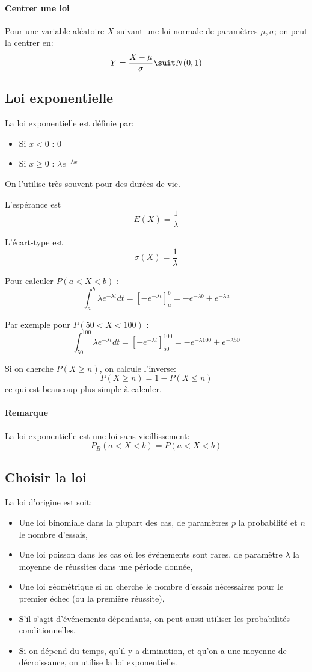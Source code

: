 \documentclass[10pt,a4paper,french]{article}
\begin{document}
\paragraph{Centrer une loi}
Pour une variable aléatoire $X$ suivant une loi normale de paramètres $\mu, \sigma$; on peut la centrer en: 
\[Y = \frac{X - \mu}{\sigma} \suit N(0, 1)\]

\subsection{Loi exponentielle}

La loi exponentielle est définie par:
\begin{itemize}
\item Si $x < 0$ : 0
\item Si $x \geq 0$ : $\lambda e^{-\lambda x}$
\end{itemize}

On l'utilise très souvent pour des durées de vie.

L'espérance est \[E(X) = \frac{1}{\lambda}\]

L'écart-type est \[ \sigma(X) = \frac{1}{\lambda} \]

Pour calculer $P(a < X < b)$ : \[ \int_a^b \lambda e^{-\lambda t} dt = \left[ -e^{-\lambda t} \right]_a^b = -e^{-\lambda b} + e^{-\lambda a} \]

Par exemple pour $P(50 < X < 100)$ : \[ \int_{50}^{100} \lambda e^{-\lambda t} dt = \left[ -e^{-\lambda t} \right]_{50}^{100} = -e^{-\lambda 100} + e^{-\lambda 50} \]

Si on cherche $P(X \geq n)$, on calcule l'inverse: \[ P(X \geq n) = 1 - P(X \leq n) \] ce qui est beaucoup plus simple à calculer.

\paragraph{Remarque}
La loi exponentielle est une loi sans vieillissement: \[ P_B(a < X < b) = P(a < X < b) \]

\subsection{Choisir la loi}

La loi d'origine est soit:

\begin{itemize}
\item Une loi binomiale dans la plupart des cas, de paramètres $p$ la probabilité et $n$ le nombre d'essais,
\item Une loi poisson dans les cas où les événements sont rares, de paramètre $\lambda$ la moyenne de réussites dans une période donnée,
\item Une loi géométrique si on cherche le nombre d'essais nécessaires pour le premier échec (ou la première réussite),
\item S'il s'agit d'événements dépendants, on peut aussi utiliser les probabilités conditionnelles.
\item Si on dépend du temps, qu'il y a diminution, et qu'on a une moyenne de décroissance, on utilise la loi exponentielle.
\end{itemize}
\end{document}
